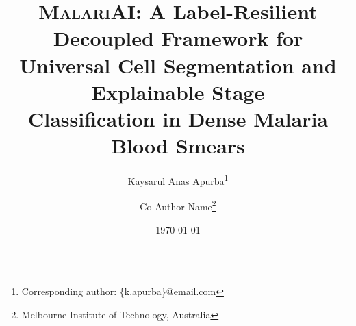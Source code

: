 \documentclass[10pt,twocolumn]{article}
\newcommand{\malariai}{\textsc{MalariAI}}
\begin{document}
\title{%
  \textbf{\malariai: A Label-Resilient Decoupled Framework for\\
  Universal Cell Segmentation and Explainable Stage\\
  Classification in Dense Malaria Blood Smears}%
}

\author[1]{Kaysarul Anas Apurba\thanks{Corresponding author: \{k.apurba\}@email.com}}
\author[2]{Co-Author Name\thanks{Melbourne Institute of Technology, Australia}}


\setlength{\affilsep}{0.5em}

\date{\today}

\maketitle
\thispagestyle{empty}
\end{document}
